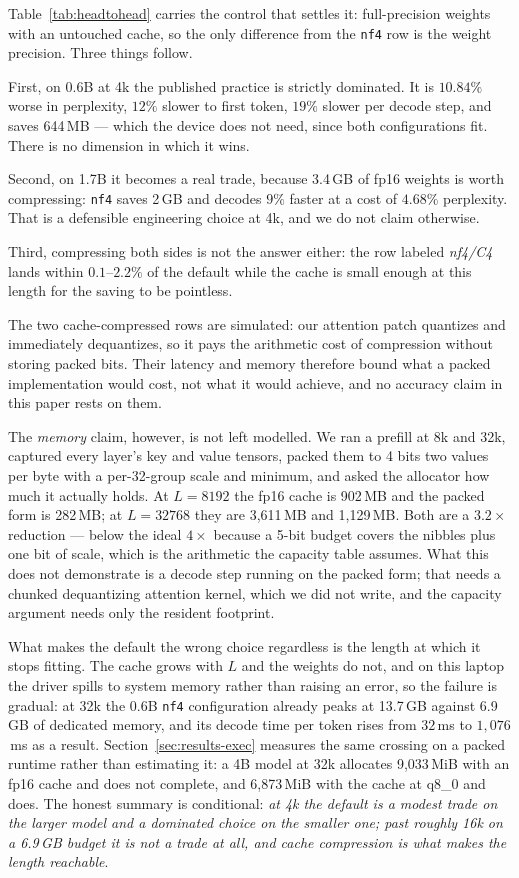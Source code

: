 \documentclass[10pt,journal]{IEEEtran}
\begin{document}
Table~\ref{tab:headtohead} carries the control that settles it: full-precision
weights with an untouched cache, so the only difference from the \texttt{nf4} row
is the weight precision. Three things follow.

First, on 0.6B at 4k the published practice is strictly dominated. It is $10.84\%$
worse in perplexity, $12\%$ slower to first token, $19\%$ slower per decode step,
and saves 644\,MB --- which the device does not need, since both configurations
fit. There is no dimension in which it wins.

Second, on 1.7B it becomes a real trade, because 3.4\,GB of fp16 weights is worth
compressing: \texttt{nf4} saves 2\,GB and decodes $9\%$ faster at a cost of
$4.68\%$ perplexity. That is a defensible engineering choice at 4k, and we do not
claim otherwise.

Third, compressing both sides is not the answer either: the row labeled
\emph{nf4/C4} lands within $0.1$--$2.2\%$ of the default while the cache is small
enough at this length for the saving to be pointless.

The two cache-compressed rows are simulated: our attention patch quantizes and
immediately dequantizes, so it pays the arithmetic cost of compression without
storing packed bits. Their latency and memory therefore bound what a packed
implementation would cost, not what it would achieve, and no accuracy claim in
this paper rests on them.

The \emph{memory} claim, however, is not left modelled. We ran a prefill at 8k and
32k, captured every layer's key and value tensors, packed them to 4 bits two
values per byte with a per-32-group scale and minimum, and asked the allocator how
much it actually holds. At $L{=}8192$ the fp16 cache is 902\,MB and the packed form
is 282\,MB; at $L{=}32768$ they are 3{,}611\,MB and 1{,}129\,MB. Both are a
$3.2\times$ reduction --- below the ideal $4\times$ because a 5-bit budget covers
the nibbles plus one bit of scale, which is the arithmetic the capacity table
assumes. What this does not demonstrate is a decode step running on the packed
form; that needs a chunked dequantizing attention kernel, which we did not write,
and the capacity argument needs only the resident footprint.

What makes the default the wrong choice regardless is the length at which it stops
fitting. The cache grows with $L$ and the weights do not, and on this laptop the
driver spills to system memory rather than raising an error, so the failure is
gradual: at 32k the 0.6B \texttt{nf4} configuration already peaks at 13.7\,GB
against 6.9\,GB of dedicated memory, and its decode time per token rises from
$32$\,ms to $1{,}076$\,ms as a result. Section~\ref{sec:results-exec} measures the
same crossing on a packed runtime rather than estimating it: a 4B model at 32k
allocates 9{,}033\,MiB with an fp16 cache and does not complete, and 6{,}873\,MiB
with the cache at q8\_0 and does. The honest summary is
conditional: \emph{at 4k the default is a modest trade on the larger model and a
dominated choice on the smaller one; past roughly 16k on a 6.9\,GB budget it is
not a trade at all, and cache compression is what makes the length reachable}.
\end{document}
